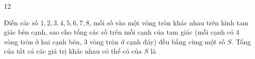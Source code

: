 \begin{probbox}{12}{\relax}
\begin{minipage}[t]{0.63\linewidth}
Điền các số $1, 2, 3, 4, 5, 6, 7, 8$, mỗi số vào một vòng tròn khác nhau trên hình tam giác bên cạnh, sao cho tổng các số trên mỗi
cạnh của tam giác (mỗi cạnh có $4$ vòng tròn ở hai cạnh bên, $3$ vòng tròn ở cạnh đáy) đều bằng cùng một số $S$. Tổng của tất cả
các giá trị khác nhau có thể có của $S$ là
\end{minipage}\hfill
\begin{minipage}[t]{0.33\linewidth}\vspace{0pt}\centering
\lgaTriEight{}{}{}{}{}{}{}{}
\end{minipage}
\end{probbox}
